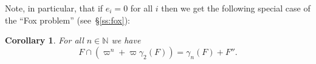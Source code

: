 \documentclass[a4paper,reqno,notitlepage]{amsart}
\newtheorem{cor}[theorem]{Corollary}
\theoremstyle{definition}
\newcommand{\N}{\mathbb N}
\newcommand{\Z}{\mathbb Z}
\renewcommand\ss{{\mathfrak s}}
\newcommand\U{\mathscr U}
\begin{document}
%
%

Note, in particular, that if $e_i=0$ for all $i$ then we get the
following special case of the ``Fox problem'' (see~\S\ref{ss:fox}):
\begin{cor}
  For all $n\in\N$ we have
  \[F\cap(\varpi^n+\varpi\gamma_2(F))=\gamma_n(F)+F''.\]
\end{cor}
\end{document}
